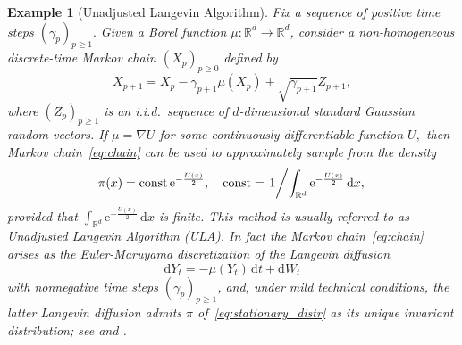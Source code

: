 \documentclass[bj]{imsart}
\def\rmd{\mathrm{d}}
\def\rme{\mathrm{e}}
\newtheorem{example}{Example}
\begin{document}
\begin{example}[Unadjusted Langevin Algorithm]
\label{exam:langevin-algorithm}
Fix a sequence of positive time steps \((\gamma_p)_{p\geq 1}.\) Given a Borel function $\mu\colon\mathbb{R}^{d}\to\mathbb{R}^{d}$,
consider a non-homogeneous
discrete-time Markov chain $(X_{p})_{p\geq0}$ defined by
\begin{equation}\label{eq:chain}
X_{p+1}=X_{p}-\gamma_{p+1}\mu(X_{p})+\sqrt{\gamma_{p+1}}Z_{p+1},\end{equation}
where $\left(Z_{p}\right)_{p\geq1}$ is an i.i.d.\ sequence of $d$-dimensional
standard Gaussian random vectors. If
$\mu= \nabla U$
for some continuously differentiable function $U,$ then Markov chain~\eqref{eq:chain} can be used to approximately sample from the density
\begin{equation}\label{eq:stationary_distr}
\pi(x)= \mathrm{const}\,\rme^{-\frac{U(x)}{2}}, \quad \mathrm{const}= \left. 1 \middle /{\int_{\mathbb{R}^{d}} \rme^{-\frac{U(x)}{2}}\, \rmd x,} \right.
\end{equation}
provided that \(\int_{\mathbb{R}^{d}} \rme^{-\frac{U(x)}{2}}\,\rmd x\) is finite. This method is usually referred to as
Unadjusted Langevin Algorithm (ULA).
In fact the Markov chain~\eqref{eq:chain}
arises as the Euler-Maruyama discretization
of the Langevin diffusion
\[
\rmd Y_t=-\mu(Y_t)\,\rmd t+ \rmd W_t
\]
with nonnegative time steps $(\gamma_p)_{p\ge1}$,
and,  under mild technical conditions, the latter Langevin diffusion admits $\pi$
of~\eqref{eq:stationary_distr}
as its unique invariant distribution; see \cite{dalalyan2017theoretical} and \cite{durmus:moulines:2017}.
\end{example}
\end{document}
